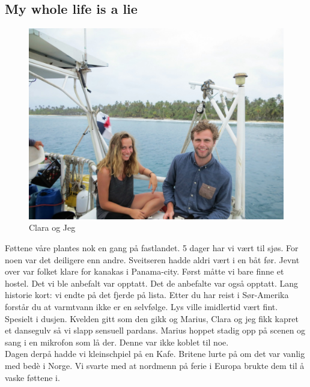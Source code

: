 
\begin{figure}[H]
\end{figure}

\\
\subsection*{My whole life is a lie}

\begin{figure}[H]
	\centering
	\includegraphics[width=\textwidth]{akselogclara}
	\caption{Clara og Jeg}
	\label{fig:claraogaksel}
\end{figure}

Føttene våre plantes nok en gang på fastlandet. 5 dager har vi vært
til sjøs.  For
noen var det deiligere enn andre. Sveitseren hadde aldri vært i en båt
før. Jevnt over var folket klare for kanakas i Panama-city.
Først måtte vi bare finne et hostel. Det vi ble anbefalt var opptatt.
Det de anbefalte var også opptatt. Lang historie kort: vi endte på det
fjerde på lista. Etter du har reist i Sør-Amerika forstår du at
varmtvann ikke er en selvfølge. Lys ville imidlertid vært fint.
Spesielt i dusjen.
Kvelden gitt som den gikk og Marius, Clara og jeg fikk kapret et
dansegulv så vi slapp sensuell pardans. Marius hoppet stadig opp på
scenen og sang i en mikrofon som lå der. Denne var ikke koblet til
noe. \\
Dagen derpå hadde vi kleinschpiel på en Kafe. Britene lurte på om
det var vanlig med bedè i Norge. Vi svarte med at nordmenn på ferie i
Europa brukte dem til å vaske føttene i.

